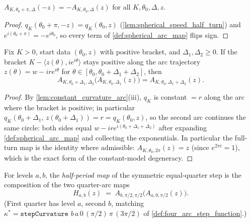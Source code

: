 \begin{lemma}
  \label{lem:arc_map_half_turn}
  $A_{K,\theta_0+\pi,\Delta}(-z)=-A_{K,\theta_0,\Delta}(z)$ for all
  $K,\theta_0,\Delta,z$.
\end{lemma}

\begin{proof}

\leanok
  $q_K(\theta_0+\pi,-z)=q_K(\theta_0,z)$ (\cref{lem:spherical_speed_half_turn}) and
  $e^{i(\theta_0+\pi)}=-e^{i\theta_0}$, so every term of
  \cref{def:spherical_arc_map} flips sign.
\end{proof}

\begin{lemma}
  \label{lem:arc_map_concat}
  Fix $K>0$, start data $(\theta_0,z)$ with positive bracket, and $\Delta_1,\Delta_2\ge0$.
  If the bracket $K-\langle z(\theta),ie^{i\theta}\rangle$ stays positive along the arc
  trajectory $z(\theta)=w-ire^{i\theta}$ for $\theta\in[\theta_0,\theta_0+\Delta_1+
  \Delta_2]$, then
  \[
    A_{K,\theta_0+\Delta_1,\Delta_2}\bigl(A_{K,\theta_0,\Delta_1}(z)\bigr)
    =A_{K,\theta_0,\Delta_1+\Delta_2}(z) .
  \]
\end{lemma}

\begin{proof}

\leanok
  By \cref{lem:constant_curvature_arc}(iii), $q_K$ is constant $=r$ along the arc where
  the bracket is positive; in particular
  $q_K(\theta_0+\Delta_1,\,z(\theta_0+\Delta_1))=r=q_K(\theta_0,z)$, so the second arc
  continues the same circle: both sides equal $w-ire^{i(\theta_0+\Delta_1+\Delta_2)}$
  after expanding \cref{def:spherical_arc_map} and collecting the exponentials.
  In particular the full-turn map is the identity where admissible:
  $A_{K,\theta_0,2\pi}(z)=z$ (since $e^{2\pi i}=1$), which is the exact form of the
  constant-model degeneracy.
\end{proof}

\begin{definition}
  \label{def:step_half_map}
  For levels $a,b$, the \emph{half-period map} of the symmetric equal-quarter step is
  the composition of the two quarter-arc maps
  \[
    H_{a,b}(z)\;=\;A_{b,\pi/2,\pi/2}\bigl(A_{a,0,\pi/2}(z)\bigr) .
  \]
  (First quarter has level $a$, second $b$, matching
  $\kappa^\ast=\texttt{stepCurvature } b\,a\,0\,(\pi/2)\,\pi\,(3\pi/2)$ of
  \cref{def:four_arc_step_function}.)
\end{definition}

